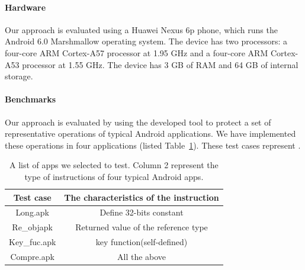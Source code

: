 \paragraph*{Hardware} Our approach is evaluated using a Huawei Nexus 6p phone, which runs the Android 6.0 Marshmallow operating system. The device has two processors: a four-core ARM Cortex-A57 processor at 1.95 GHz and a four-core ARM Cortex-A53 processor at 1.55 GHz. 
The device has 3 GB of RAM and 64 GB of internal storage. 

\paragraph*{Benchmarks} Our approach is evaluated by using the developed tool to protect a set of representative operations of typical Android applications. We have implemented these operations in four applications (listed Table~\ref{tab:Table 1}).
These test cases represent . 



\begin{table}[htbp]
  \centering
  \begin{tabular}{c c}
  \toprule
  Test case & The characteristics of the instruction\\
  \hline
  \hline
  Long.apk & Define 32-bits constant\\


  Re\_objapk & Returned value of the reference type\\


  Key\_fuc.apk & key function(self-defined)\\


  Compre.apk & All the above\\
  \bottomrule
  \end{tabular}
  \caption{A list of apps we selected to test. Column 2 represent the type of instructions of four typical Android apps. }\label{tab:Table 1}
\end{table}

